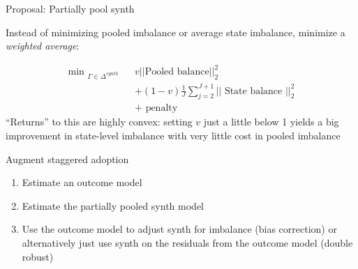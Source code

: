 \documentclass{beamer}
\begin{document}












\begin{frame}{Proposal: Partially pool synth}

Instead of minimizing pooled imbalance or average state imbalance, minimize a \emph{weighted average}:

\begin{eqnarray*}
\textrm{min  }_{\Gamma \in \Delta^{synth}}  &&v|| \textrm{Pooled balance} ||^2_2 \\
&&+ (1-v) \frac{1}{J} \sum_{j=2}^{J+1} ||\textrm{ State balance } ||^2_2 \\
&&+ \textrm{ penalty }
\end{eqnarray*}``Returns'' to this are highly convex: setting $v$ just a little below 1 yields a big improvement in state-level imbalance with very little cost in pooled imbalance

\end{frame}











\begin{frame}{Augment staggered adoption}

\begin{enumerate}
\item Estimate an outcome model
\item Estimate the partially pooled synth model
\item Use the outcome model to adjust synth for imbalance (bias correction) or alternatively just use synth on the residuals from the outcome model (double robust)
\end{enumerate}

\end{frame}
\end{document}
